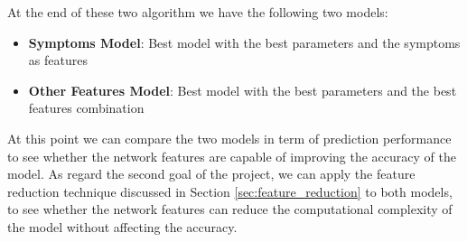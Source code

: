 At the end of these two algorithm we have the following two models:\\

\begin{itemize}
    \setlength\itemsep{0.4em} %
    \item \textbf{Symptoms Model}: Best model with the best parameters and the symptoms as features
    \item \textbf{Other Features Model}: Best model with the best parameters and the best features combination
\end{itemize}
\vspace{0.4cm}

At this point we can compare the two models in term of prediction performance to see whether the network features
are capable of improving the accuracy of the model. As regard the second goal of the project, we 
can apply the feature reduction technique discussed in Section \ref{sec:feature_reduction}
to both models, to see whether the network features can reduce the computational
complexity of the model without affecting the accuracy.
